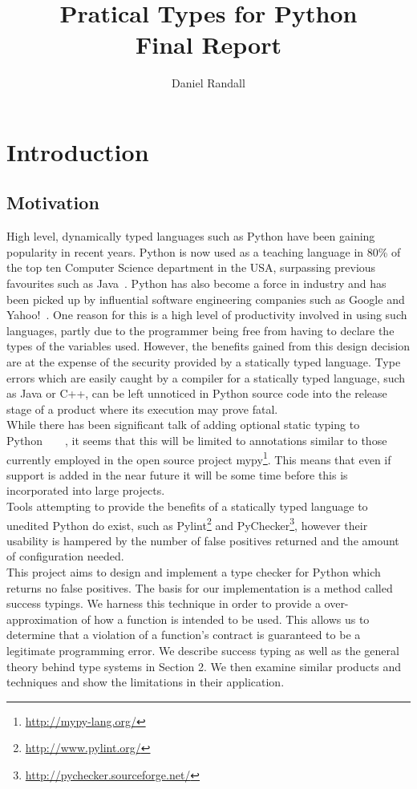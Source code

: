 \documentclass[12pt, titlepage]{article}
\title{Pratical Types for Python \\ Final Report}
\author{Daniel Randall}
\date{}
\begin{document}
\maketitle

\tableofcontents
\newpage

\section{Introduction}
\subsection{Motivation}
High level, dynamically typed languages such as Python have been gaining popularity in recent years. Python is now used as a teaching language in 80\% of the top ten Computer Science department in the USA, surpassing previous favourites such as Java~\cite{guoTeaching}. Python has also become a force in industry and has been picked up by influential software engineering companies such as Google and Yahoo!~\cite{organisationsPython}. One reason for this is a high level of productivity involved in using such languages, partly due to the programmer being free from having to declare the types of the variables used. However, the benefits gained from this design decision are at the expense of the security provided by a statically typed language. Type errors which are easily caught by a compiler for a statically typed language, such as Java or C++, can be left unnoticed in Python source code into the release stage of a product where its execution may prove fatal. \\ %
While there has been significant talk of adding optional static typing to Python~\cite{guido1}~\cite{guido2}~\cite{guido3}~\cite{guidoLatest}, it seems that this will be limited to annotations similar to those currently employed in the open source project mypy\footnote{\url{http://mypy-lang.org/}}. This means that even if support is added in the near future it will be some time before this is incorporated into large projects. \\
Tools attempting to provide the benefits of a statically typed language to unedited Python do exist, such as Pylint\footnote{\url{http://www.pylint.org/}} and PyChecker\footnote{\url{http://pychecker.sourceforge.net/}}, however their usability is hampered by the number of false positives returned and the amount of configuration needed. \\
This project aims to design and implement a type checker for Python which returns no false positives. The basis for our implementation is a method called success typings. We harness this technique in order to provide a over-approximation of how a function is intended to be used. This allows us to determine that a violation of a function's contract is guaranteed to be a legitimate programming error. We describe success typing as well as the general theory behind type systems in Section 2. We then examine similar products and techniques and show the limitations in their application. \\
\end{document}
